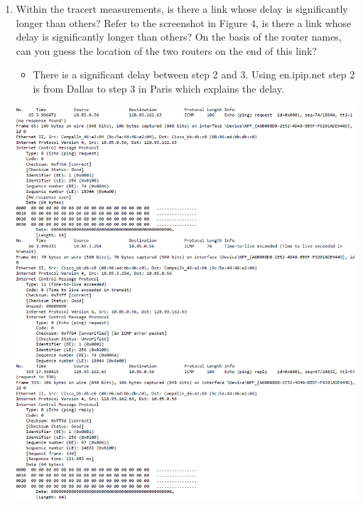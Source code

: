 \documentclass[11pt]{article}
\begin{document}
\begin{enumerate}[label=(\alph*)]
\begin{itemize}
\begin{enumerate}[label=(\arabic*)]
                
            \item Within the tracert measurements, is there a link whose delay is significantly longer than others?  Refer to the screenshot in Figure 4, is there a link whose delay is significantly longer than others?  On the basis of the router names, can you guess the location of the two routers on the end of this link?
                \begin{itemize}
                    \item There is a significant delay between step 2 and 3. Using en.ipip.net step 2 is from Dallas to step 3 in Paris which explains the delay.
                \end{itemize}
            \includegraphics[width=1\textwidth]{HW1Template/Wireshark_trace_print.PNG}
            
        \end{enumerate}
    \end{itemize}
\end{enumerate}
\end{document}
